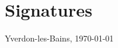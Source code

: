 \documentclass[a4paper,12pt,oneside]{article}
\begin{document}
	
	
	\thispagestyle{empty}
	\setcounter{page}{1}
\newpage

    
    \tableofcontents
    \newpage
    
    
	\listoftables
    
	\listoffigures
    
	\newpage

	

	

	

	
	
	\section{Signatures}
  
  
 \begin{flushright}
Yverdon-les-Bains, \today\\
\nomAuteur
\end{flushright}
  
	
\end{document}
